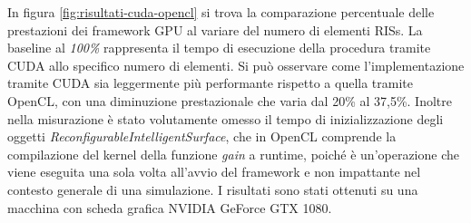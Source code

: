In figura \ref{fig:risultati-cuda-opencl} si trova la comparazione percentuale delle
prestazioni dei framework GPU al variare del numero di elementi RISs. La
baseline al \textit{100\%} rappresenta il tempo di esecuzione della procedura tramite
CUDA allo specifico numero di elementi. Si può osservare come l'implementazione
tramite CUDA sia leggermente più performante rispetto a quella tramite OpenCL, con
una diminuzione prestazionale che varia dal 20\% al 37,5\%. Inoltre nella
misurazione è stato volutamente omesso il tempo di inizializzazione degli
oggetti \textit{ReconfigurableIntelligentSurface}, che in OpenCL comprende la
compilazione del kernel della funzione \textit{gain} a runtime, poiché è un'operazione
che viene eseguita una sola volta all'avvio del framework e non impattante nel
contesto generale di una simulazione. I risultati sono stati ottenuti su una macchina
con scheda grafica NVIDIA GeForce GTX 1080.

